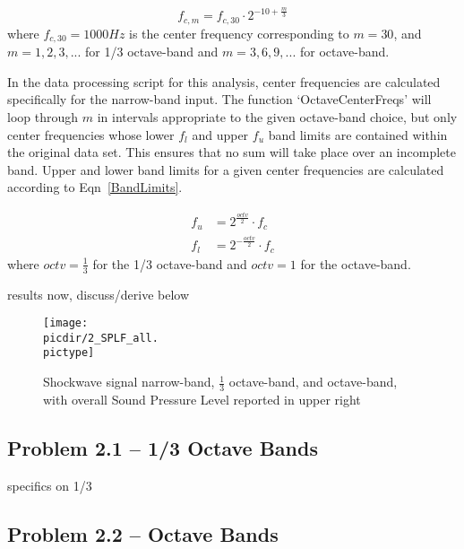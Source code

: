 \documentclass[twocolumn,10pt]{asme2ej}
\begin{document}
\begin{equation} \label{CenterFreqs}
f_{c,m} = f_{c,30}\cdot 2^{-10 + \frac{m}{3}}
\end{equation}
\noindent where $f_{c,30}=1000Hz$ is the center frequency corresponding to $m=30$, and $m=1,2,3,...$ for 1/3 octave-band and $m=3,6,9,...$ for octave-band.

In the data processing script for this analysis, center frequencies are calculated specifically for the narrow-band input.  The function `OctaveCenterFreqs' will loop through $m$ in intervals appropriate to the given octave-band choice, but only center frequencies whose lower $f_l$ and upper $f_u$ band limits are contained within the original data set.  This ensures that no sum will take place over an incomplete band.  Upper and lower band limits for a given center frequencies are calculated according to Eqn~\ref{BandLimits}.

\begin{equation} \label{BandLimits}
\begin{split}
f_u &= 2^{\frac{octv}{2}} \cdot f_c \\
f_l &= 2^{-\frac{octv}{2}} \cdot f_c
\end{split}
\end{equation}
\noindent where $octv=\frac{1}{3}$ for the 1/3 octave-band and $octv=1$ for the octave-band.


results now, discuss/derive below

\begin{figure}[htb]
\begin{center}
\texttt{[image: \\picdir/2\_SPLF\_all.\\pictype]}
\caption{Shockwave signal narrow-band, $\frac{1}{3}$ octave-band, and octave-band, with overall Sound Pressure Level reported in upper right}
\label{Bands}
\end{center}
\end{figure}


\subsection{Problem 2.1 -- 1/3 Octave Bands}

specifics on 1/3

\subsection{Problem 2.2 -- Octave Bands}
\end{document}
